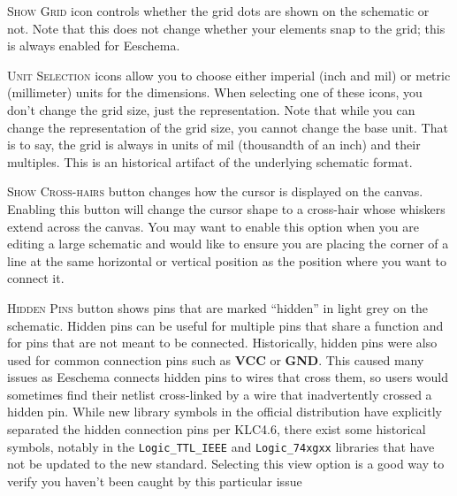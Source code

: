\newpage
{}\textsc{Show Grid} icon controls whether the grid dots are shown on the schematic or not.
Note that this does not change whether your elements snap to the grid; this is always enabled for Eeschema.

\textsc{Unit Selection} icons allow you to choose either imperial (inch and mil) or metric (millimeter) units for the dimensions.  
When selecting one of these icons, you don't change the grid size, just the representation.
Note that while you can change the representation of the grid size, you cannot change the base unit.
That is to say, the grid is always in units of mil (thousandth of an inch) and their multiples.
This is an historical artifact of the underlying schematic format.

\textsc{Show Cross-hairs} button changes how the cursor is displayed on the canvas.
Enabling this button will change the cursor shape to a cross-hair whose whiskers extend across the canvas.
You may want to enable this option when you are editing a large schematic and would like to ensure you are placing the corner of a line at the same horizontal or vertical position as the position where you want to connect it.

\textsc{Hidden Pins} button shows pins that are marked ``hidden'' in light grey on the schematic.
Hidden pins can be useful for multiple pins that share a function and for pins that are not meant to be connected.
Historically, hidden pins were also used for common connection pins such as \textbf{VCC} or \textbf{GND}.
This caused many issues as Eeschema connects hidden pins to wires that cross them, so users would sometimes find their netlist cross-linked by a wire that inadvertently crossed a hidden pin.
While new library symbols in the official distribution have explicitly separated the hidden connection pins per KLC4.6, there exist some historical symbols, notably in the \texttt{Logic\_TTL\_IEEE} and \texttt{Logic\_74xgxx} libraries that have not be updated to the new standard.
Selecting this view option is a good way to verify you haven't been caught by this particular issue

